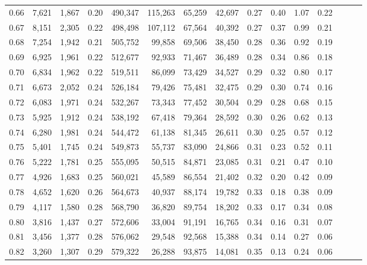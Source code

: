 \begin{tabular}{rrrrrrrrrrrrrrr}
0.66 &   7,621 &  1,867 &  0.20 &  490,347 &  115,263 &   65,259 &   42,697 &  0.27 &  0.40 &  1.07 &      0.22 \\
0.67 &   8,151 &  2,305 &  0.22 &  498,498 &  107,112 &   67,564 &   40,392 &  0.27 &  0.37 &  0.99 &      0.21 \\
0.68 &   7,254 &  1,942 &  0.21 &  505,752 &   99,858 &   69,506 &   38,450 &  0.28 &  0.36 &  0.92 &      0.19 \\
0.69 &   6,925 &  1,961 &  0.22 &  512,677 &   92,933 &   71,467 &   36,489 &  0.28 &  0.34 &  0.86 &      0.18 \\
0.70 &   6,834 &  1,962 &  0.22 &  519,511 &   86,099 &   73,429 &   34,527 &  0.29 &  0.32 &  0.80 &      0.17 \\
0.71 &   6,673 &  2,052 &  0.24 &  526,184 &   79,426 &   75,481 &   32,475 &  0.29 &  0.30 &  0.74 &      0.16 \\
0.72 &   6,083 &  1,971 &  0.24 &  532,267 &   73,343 &   77,452 &   30,504 &  0.29 &  0.28 &  0.68 &      0.15 \\
0.73 &   5,925 &  1,912 &  0.24 &  538,192 &   67,418 &   79,364 &   28,592 &  0.30 &  0.26 &  0.62 &      0.13 \\
0.74 &   6,280 &  1,981 &  0.24 &  544,472 &   61,138 &   81,345 &   26,611 &  0.30 &  0.25 &  0.57 &      0.12 \\
0.75 &   5,401 &  1,745 &  0.24 &  549,873 &   55,737 &   83,090 &   24,866 &  0.31 &  0.23 &  0.52 &      0.11 \\
0.76 &   5,222 &  1,781 &  0.25 &  555,095 &   50,515 &   84,871 &   23,085 &  0.31 &  0.21 &  0.47 &      0.10 \\
0.77 &   4,926 &  1,683 &  0.25 &  560,021 &   45,589 &   86,554 &   21,402 &  0.32 &  0.20 &  0.42 &      0.09 \\
0.78 &   4,652 &  1,620 &  0.26 &  564,673 &   40,937 &   88,174 &   19,782 &  0.33 &  0.18 &  0.38 &      0.09 \\
0.79 &   4,117 &  1,580 &  0.28 &  568,790 &   36,820 &   89,754 &   18,202 &  0.33 &  0.17 &  0.34 &      0.08 \\
0.80 &   3,816 &  1,437 &  0.27 &  572,606 &   33,004 &   91,191 &   16,765 &  0.34 &  0.16 &  0.31 &      0.07 \\
0.81 &   3,456 &  1,377 &  0.28 &  576,062 &   29,548 &   92,568 &   15,388 &  0.34 &  0.14 &  0.27 &      0.06 \\
0.82 &   3,260 &  1,307 &  0.29 &  579,322 &   26,288 &   93,875 &   14,081 &  0.35 &  0.13 &  0.24 &      0.06 \\

\end{tabular}
